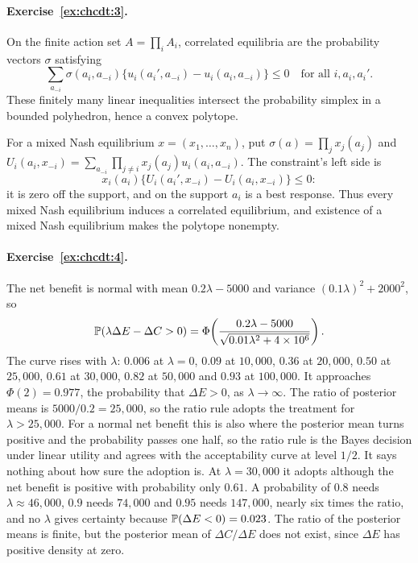 \paragraph{Exercise~\ref{ex:chcdt:3}.} On the finite action set $A = \prod_i A_i$, correlated equilibria are the probability vectors $\sigma$ satisfying
\[
\sum_{a_{-i}}\sigma(a_i,a_{-i})\{u_i(a_i',a_{-i}) - u_i(a_i,a_{-i})\} \le 0
\quad\text{for all }i,a_i,a_i'.
\]
These finitely many linear inequalities intersect the probability simplex in a bounded polyhedron, hence a convex polytope.

For a mixed Nash equilibrium $x = (x_1,\dots,x_n)$, put $\sigma(a) = \prod_j x_j(a_j)$ and $U_i(a_i,x_{-i}) = \sum_{a_{-i}}\prod_{j\ne i}x_j(a_j)u_i(a_i,a_{-i})$. The constraint's left side is
\[
x_i(a_i)\{U_i(a_i',x_{-i}) - U_i(a_i,x_{-i})\} \le 0:
\]
it is zero off the support, and on the support $a_i$ is a best response. Thus every mixed Nash equilibrium induces a correlated equilibrium, and existence of a mixed Nash equilibrium makes the polytope nonempty.

\paragraph{Exercise~\ref{ex:chcdt:4}.} The net benefit is normal with mean $0.2\lambda-5000$ and variance $(0.1\lambda)^2+2000^2$, so
\[
\mathbb{P}(\lambda\Delta E-\Delta C>0) = \Phi\!\left(\frac{0.2\lambda-5000}{\sqrt{0.01\lambda^2+4\times10^6}}\right).
\]
The curve rises with $\lambda$: $0.006$ at $\lambda=0$, $0.09$ at $10{,}000$, $0.36$ at $20{,}000$, $0.50$ at $25{,}000$, $0.61$ at $30{,}000$, $0.82$ at $50{,}000$ and $0.93$ at $100{,}000$. It approaches $\Phi(2)=0.977$, the probability that $\Delta E>0$, as $\lambda\to\infty$. The ratio of posterior means is $5000/0.2=25{,}000$, so the ratio rule adopts the treatment for $\lambda>25{,}000$. For a normal net benefit this is also where the posterior mean turns positive and the probability passes one half, so the ratio rule is the Bayes decision under linear utility and agrees with the acceptability curve at level $1/2$. It says nothing about how sure the adoption is. At $\lambda=30{,}000$ it adopts although the net benefit is positive with probability only $0.61$. A probability of $0.8$ needs $\lambda\approx46{,}000$, $0.9$ needs $74{,}000$ and $0.95$ needs $147{,}000$, nearly six times the ratio, and no $\lambda$ gives certainty because $\mathbb{P}(\Delta E<0)=0.023$. The ratio of the posterior means is finite, but the posterior mean of $\Delta C/\Delta E$ does not exist, since $\Delta E$ has positive density at zero.

